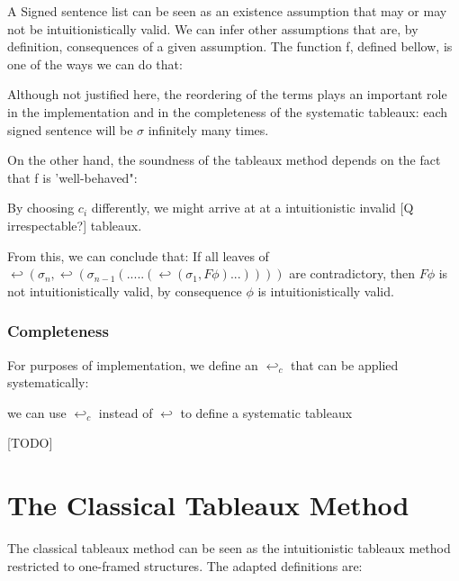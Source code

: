 \documentclass[runningheads]{llncs}
\begin{document}
A Signed sentence list can be seen as an existence assumption that may or may not be intuitionistically valid. We can infer other assumptions that are, by definition, 
consequences of a given assumption. The function f, defined bellow, is one of the ways we can do that: 


\fIntuitionisticDefinition


Although not justified here, the reordering of the terms plays an important role in the implementation and in the completeness of the systematic tableaux: 
each signed sentence will be $\sigma$ infinitely many times.

On the other hand, 
the soundness of the tableaux method depends on the fact that f is 'well-behaved":

\wellBehavedTheorem

By choosing $c_i$ differently, we might arrive at at a intuitionistic invalid [Q irrespectable?] tableaux.   


\TableauxDevelopmentDefinition

\TableauxDevelopmentExampleFigure

\soundnessTheorem



    From this, we can conclude that: 
        If all leaves of $ \hookleftarrow (\sigma_n,\hookleftarrow(\sigma_{n-1}(.....(\hookleftarrow(\sigma_1 , F\phi)...)))) $ are contradictory, then $F\phi$ is not intuitionistically valid, by consequence 
        $\phi$ is intuitionistically valid. 
        

\subsubsection{Completeness }

For purposes of implementation, we define an $\hookleftarrow_c$ that can be applied systematically: 

\completeiteratordefinition

we can use $\hookleftarrow_c$ instead of $\hookleftarrow$ to define a systematic tableaux

[TODO]

\section{The Classical Tableaux Method}

The classical tableaux method can be seen as the intuitionistic tableaux method restricted to 
one-framed structures. The adapted definitions are: 
\end{document}
